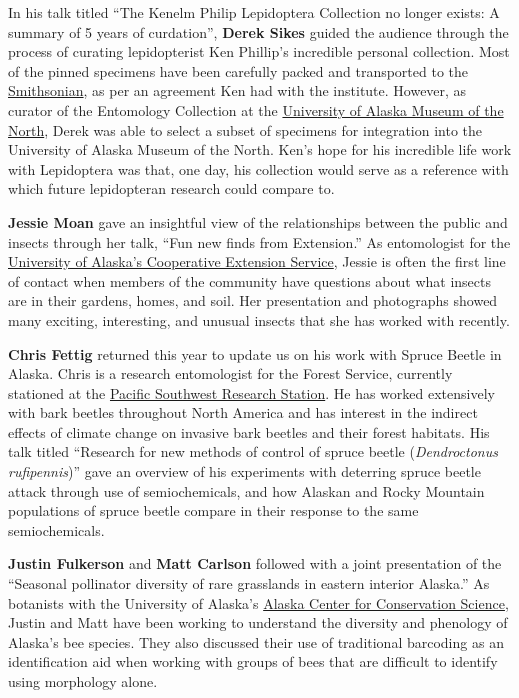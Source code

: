 In his talk titled ``The Kenelm Philip Lepidoptera Collection no longer exists: A summary of 5 years of curdation'', \textbf{Derek Sikes} guided the audience through the process of curating lepidopterist Ken Phillip’s incredible personal collection. Most of the pinned specimens have been carefully packed and transported to the \href{https://www.si.edu/}{Smithsonian}, as per an agreement Ken had with the institute. However, as curator of the Entomology Collection at the \href{https://www.uaf.edu/museum/}{University of Alaska Museum of the North}, Derek was able to select a subset of specimens for integration into the University of Alaska Museum of the North. Ken’s hope for his incredible life work with Lepidoptera was that, one day, his collection would serve as a reference with which future lepidopteran research could compare to.

\textbf{Jessie Moan} gave an insightful view of the relationships between the public and insects through her talk, ``Fun new finds from Extension.'' As entomologist for the \href{https://www.uaf.edu/ces/}{University of Alaska’s Cooperative Extension Service}, Jessie is often the first line of contact when members of the community have questions about what insects are in their gardens, homes, and soil. Her presentation and photographs showed many exciting, interesting, and unusual insects that she has worked with recently. 
 
\textbf{Chris Fettig} returned this year to update us on his work with Spruce Beetle in Alaska. Chris is a research entomologist for the  Forest Service, currently stationed at the \href{https://www.fs.fed.us/psw/}{Pacific Southwest Research Station}. He has worked extensively with bark beetles throughout North America and has interest in the indirect effects of climate change on invasive bark beetles and their forest habitats. His talk titled ``Research for new methods of control of spruce beetle (\textit{Dendroctonus rufipennis})'' gave an overview of his experiments with deterring spruce beetle attack through use of semiochemicals, and how Alaskan and Rocky Mountain populations of spruce beetle compare in their response to the same semiochemicals.

\textbf{Justin Fulkerson} and \textbf{Matt Carlson} followed with a joint presentation of the ``Seasonal pollinator diversity of rare grasslands in eastern interior Alaska.'' As botanists with the University of Alaska’s \href{https://accs.uaa.alaska.edu/}{Alaska Center for Conservation Science}, Justin and Matt have been working to understand the diversity and phenology of Alaska’s bee species. They also discussed their use of traditional barcoding as an identification aid when working with groups of bees that are difficult to identify using morphology alone.

